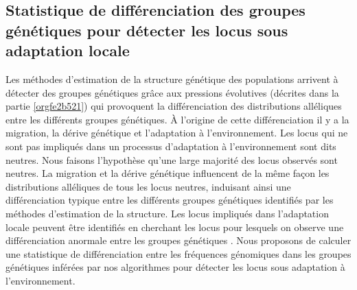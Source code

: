 \documentclass[12pt,a4paper,twoside]{ugathesis}
\begin{document}
\subsection{Statistique de différenciation des groupes génétiques pour détecter les locus sous adaptation locale}
\label{sec:orgbfe821d}

Les méthodes d'estimation de la structure génétique des populations arrivent à
détecter des groupes génétiques grâce aux pressions évolutives (décrites dans
la partie \ref{orgfe2b521}) qui provoquent la différenciation des distributions
alléliques entre les différents groupes génétiques. À l'origine de cette
différenciation il y a la migration, la dérive génétique et l'adaptation à
l'environnement. Les locus qui ne sont pas impliqués dans un processus
d'adaptation à l'environnement sont dits neutres. Nous faisons l'hypothèse
qu'une large majorité des locus observés sont neutres. La migration et la dérive
génétique influencent de la même façon les distributions alléliques de tous les
locus neutres, induisant ainsi une différenciation typique entre les différents
groupes génétiques identifiés par les méthodes d'estimation de la structure.
Les locus impliqués dans l'adaptation locale peuvent être identifiés en
cherchant les locus pour lesquels on observe une différenciation anormale entre
les groupes génétiques \citep{Lewontin175}. Nous proposons de calculer une
statistique de différenciation entre les fréquences génomiques dans les groupes
génétiques inférées par nos algorithmes pour détecter les locus sous adaptation
à l'environnement.
\end{document}

